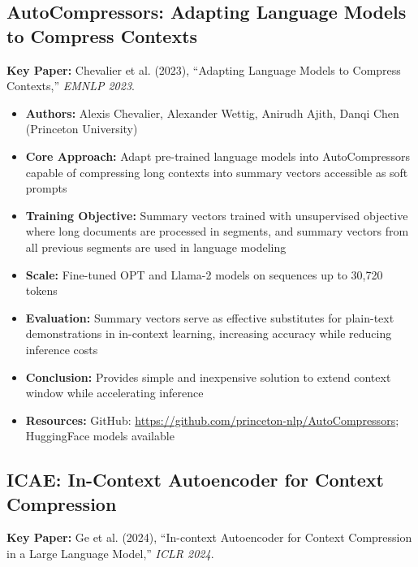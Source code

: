 \documentclass[11pt]{article}
\begin{document}
\subsection{AutoCompressors: Adapting Language Models to Compress Contexts}

\textbf{Key Paper:} Chevalier et al. (2023), ``Adapting Language Models to Compress Contexts,'' \textit{EMNLP 2023}.

\begin{itemize}[leftmargin=*]
    \item \textbf{Authors:} Alexis Chevalier, Alexander Wettig, Anirudh Ajith, Danqi Chen (Princeton University)
    \item \textbf{Core Approach:} Adapt pre-trained language models into AutoCompressors capable of compressing long contexts into summary vectors accessible as soft prompts
    \item \textbf{Training Objective:} Summary vectors trained with unsupervised objective where long documents are processed in segments, and summary vectors from all previous segments are used in language modeling
    \item \textbf{Scale:} Fine-tuned OPT and Llama-2 models on sequences up to 30,720 tokens
    \item \textbf{Evaluation:} Summary vectors serve as effective substitutes for plain-text demonstrations in in-context learning, increasing accuracy while reducing inference costs
    \item \textbf{Conclusion:} Provides simple and inexpensive solution to extend context window while accelerating inference
    \item \textbf{Resources:} GitHub: \url{https://github.com/princeton-nlp/AutoCompressors}; HuggingFace models available
\end{itemize}

\subsection{ICAE: In-Context Autoencoder for Context Compression}

\textbf{Key Paper:} Ge et al. (2024), ``In-context Autoencoder for Context Compression in a Large Language Model,'' \textit{ICLR 2024}.
\end{document}
